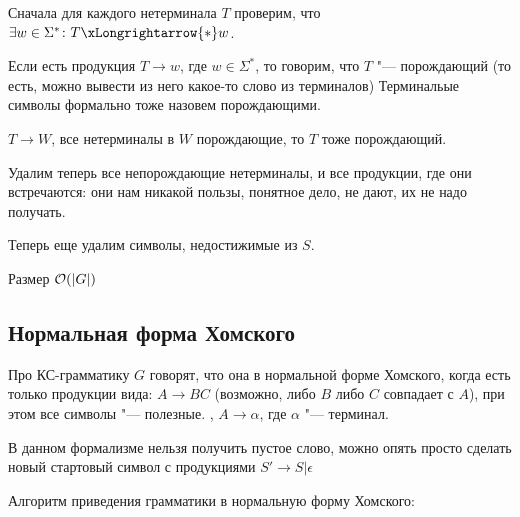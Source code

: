 \begin{enumerate}
Сначала для каждого нетерминала $T$ проверим, что $\exists w \in \Sigma^*\colon T \xLongrightarrow{*} w$.

Если есть продукция $T \to w$, где $w \in \Sigma^*$, то говорим, что $T$ "--- порождающий (то есть, можно вывести из него какое-то слово из терминалов)
Терминальые символы формально тоже назовем порождающими.

$T \to W$, все нетерминалы в $W$ порождающие, то $T$ тоже порождающий.                                              

Удалим теперь все непорождающие нетерминалы, и все продукции, где они встречаются: они нам никакой пользы, понятное дело, не дают, их не надо получать.

Теперь еще удалим символы, недостижимые из $S$.

Размер $\mathcal{O}(|G|)$
\end{enumerate}

\subsection{Нормальная форма Хомского}
\begin{Def}
Про КС-грамматику $G$ говорят, что она в нормальной форме Хомского, когда есть только продукции вида: $A \to BC$ (возможно, либо $B$ либо $C$ совпадает с $A$), при этом все символы "--- полезные.
, $A \to \alpha$, где $\alpha$ "--- терминал.
\end{Def}
\begin{Rem}
В данном формализме нельзя получить пустое слово, можно опять просто сделать новый стартовый символ с продукциями $S' \to S | \epsilon$
\end{Rem}                                                                                                                              

Алгоритм приведения грамматики в нормальную форму Хомского:

